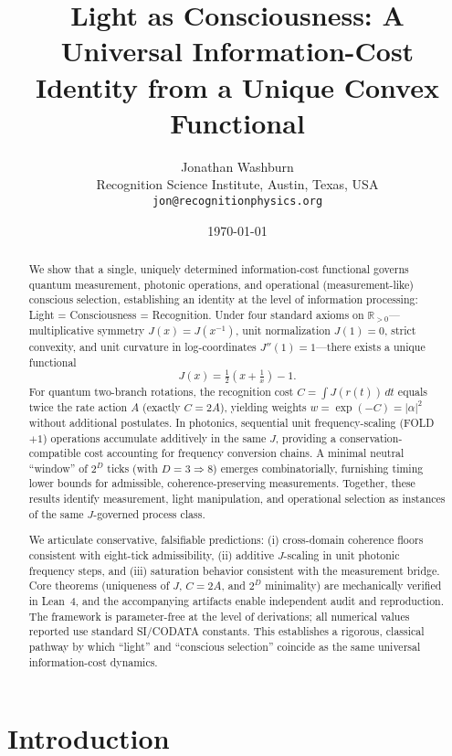\documentclass[12pt,a4paper]{article}
\title{\textbf{Light as Consciousness: A Universal Information-Cost Identity from a Unique Convex Functional}}
\author{
Jonathan Washburn\\
Recognition Science Institute, Austin, Texas, USA\\
\texttt{jon@recognitionphysics.org}
}
\date{\today}
\begin{document}
\maketitle

\begin{abstract}
We show that a single, uniquely determined information-cost functional governs quantum measurement, photonic operations, and operational (measurement-like) conscious selection, establishing an identity at the level of information processing: Light = Consciousness = Recognition. Under four standard axioms on $\mathbb{R}_{>0}$—multiplicative symmetry $J(x)=J(x^{-1})$, unit normalization $J(1)=0$, strict convexity, and unit curvature in log-coordinates $J''(1)=1$—there exists a unique functional
\[
J(x)=\tfrac{1}{2}\!\left(x+\tfrac{1}{x}\right)-1.
\]
For quantum two-branch rotations, the recognition cost $C=\int J(r(t))\,dt$ equals twice the rate action $A$ (exactly $C=2A$), yielding weights $w=\exp(-C)=|{\alpha}|^{2}$ without additional postulates. In photonics, sequential unit frequency-scaling (FOLD $+1$) operations accumulate additively in the same $J$, providing a conservation-compatible cost accounting for frequency conversion chains. A minimal neutral “window” of $2^{D}$ ticks (with $D=3\Rightarrow 8$) emerges combinatorially, furnishing timing lower bounds for admissible, coherence-preserving measurements. Together, these results identify measurement, light manipulation, and operational selection as instances of the same $J$-governed process class.

We articulate conservative, falsifiable predictions: (i) cross-domain coherence floors consistent with eight-tick admissibility, (ii) additive $J$-scaling in unit photonic frequency steps, and (iii) saturation behavior consistent with the measurement bridge. Core theorems (uniqueness of $J$, $C{= }2A$, and $2^{D}$ minimality) are mechanically verified in Lean~4, and the accompanying artifacts enable independent audit and reproduction. The framework is parameter-free at the level of derivations; all numerical values reported use standard SI/CODATA constants. This establishes a rigorous, classical pathway by which “light” and “conscious selection” coincide as the same universal information-cost dynamics.
\end{abstract}

\section{Introduction}
\end{document}
